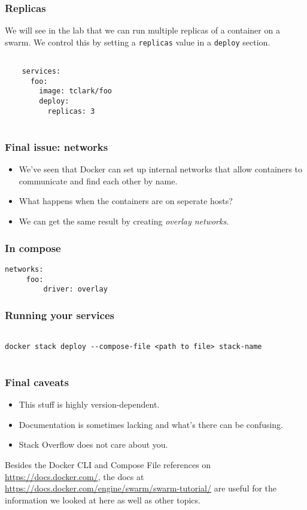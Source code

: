\documentclass[10pt]{beamer}
\begin{document}
\begin{frame}[fragile]
    \frametitle{Replicas}
    
    We will see in the lab that we can run multiple replicas of a container on a swarm. We control this
    by setting a \texttt{replicas} value in a \texttt{deploy} section.
    
    \begin{verbatim}
    
    services:
      foo:
        image: tclark/foo
        deploy:
          replicas: 3
    

    \end{verbatim}
    
   
\end{frame}


\begin{frame}
  \frametitle{Final issue: networks}
   
   \begin{itemize}
     \item We've seen that Docker can set up internal networks that allow containers to communicate and find each other by name.   
     \item What happens when the containers are on seperate hosts?
     \item We can get the same result by creating \emph{overlay networks}.
   \end{itemize}
\end{frame}

\begin{frame}[fragile]
    \frametitle{In compose}
     \begin{verbatim}
networks:
     foo:
         driver: overlay
     \end{verbatim}
 \end{frame}
 
 \begin{frame}[fragile]
    \frametitle{Running your services}
     \begin{verbatim}
     
docker stack deploy --compose-file <path to file> stack-name
     
     \end{verbatim}
 \end{frame}
 
 \begin{frame}
  \frametitle{Final caveats}
   
   \begin{itemize}
     \item This stuff is highly version-dependent.
     \item Documentation is sometimes lacking and what's there can be confusing.
     \item Stack Overflow does not care about you.
   \end{itemize}
   
   Besides the Docker CLI and Compose File references on \url{https://docs.docker.com/}, the docs at
   \url{https://docs.docker.com/engine/swarm/swarm-tutorial/} are useful for the information we looked at
   here as well as other topics.
   
   
   
   \end{frame}    
\end{document}
